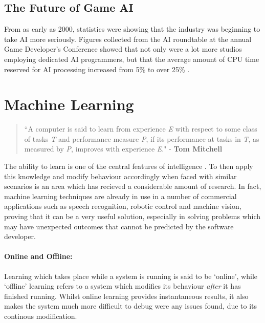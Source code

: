 \documentclass[a4paper,oneside]{report}
\begin{document}
\subsection{The Future of Game AI}

From as early as 2000, statistics were showing that the industry was beginning to take AI more seriously. Figures collected from the AI roundtable at the annual Game Developer's Conference showed that not only were a lot more studios employing dedicated AI programmers, but that the average amount of CPU time reserved for AI processing increased from 5\% to over 25\% \cite{Woodcock:oq}.

\section{Machine Learning}

\begin{quotation}``A computer is said to learn from experience \emph{E} with respect to some class of tasks \emph{T} and performance measure \emph{P}, if its performance at tasks in \emph{T}, as measured by \emph{P}, improves with experience \emph{E}." - \textbf{Tom Mitchell} \cite{mitchell1997machine} 
\end{quotation}

The ability to learn is one of the central features of intelligence \cite{Langley:1996zr}. To then apply this knowledge and modify behaviour accordingly when faced with similar scenarios is an area which has recieved a considerable amount of research. In fact, machine learning techniques are already in use in a number of commercial applications such as speech recognition, robotic control and machine vision, proving that it can be a very useful solution, especially in solving problems which may have unexpected outcomes that cannot be predicted by the software developer.

\paragraph{Online and Offline:} Learning which takes place while a system is running is said to be `online', while `offline' learning refers to a system which modifies its behaviour \emph{after} it has finished running. Whilst online learning provides instantaneous results, it also makes the system much more difficult to debug were any issues found, due to its continous modification.
\end{document}
